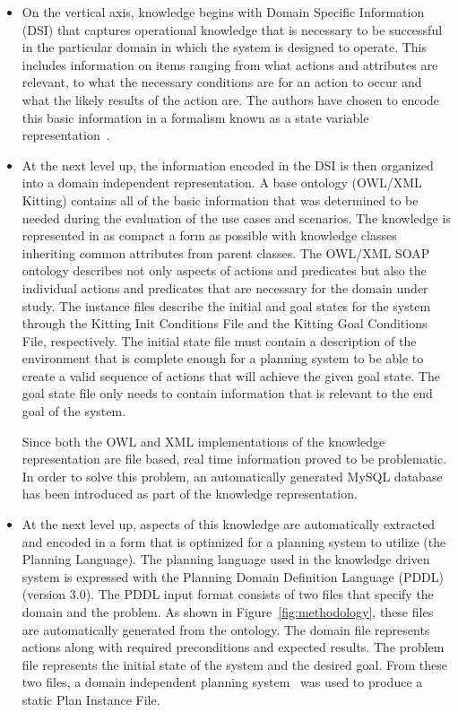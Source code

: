 \begin{itemize}
\item On the vertical axis, knowledge begins with Domain Specific Information
(DSI) that captures operational knowledge that is necessary to be
successful in the particular domain in which the system is designed to
operate. This includes information on items ranging from what actions and
attributes are relevant, to what the necessary conditions are for an action
to occur and what the likely results of the action are. The authors have
chosen to encode this basic information in a formalism known as a state
variable representation~\cite{NAU.2004}.

\item At the next level up, the information encoded in the DSI is then organized into a domain
independent representation. A base ontology (\textsf{OWL/XML Kitting})
contains all of the basic information that was determined to be needed
during the evaluation of the use cases and scenarios. The knowledge is
represented in as compact a form as possible with knowledge classes
inheriting common attributes from parent classes. The \textsf{OWL/XML SOAP}
ontology describes not only aspects of actions and predicates but also the
individual actions and predicates that are necessary for the domain under
study. The instance files describe the initial and goal states for the
system through the \textsf{Kitting Init Conditions File} and the
\textsf{Kitting Goal Conditions File}, respectively. The initial state file
must contain a description of the environment that is complete enough for a
planning system to be able to create a valid sequence of actions that will
achieve the given goal state. The goal state file only needs to contain
information that is relevant to the end goal of the system.

Since both the OWL and XML implementations of the knowledge representation are file based, real time information proved to be problematic. In order to solve this problem, an automatically generated MySQL database has been introduced as part of the knowledge representation.

\item At the next level up, aspects of this knowledge are automatically extracted and encoded in a form
that is optimized for a planning system to utilize (the Planning Language).
The planning language used in the knowledge driven system is expressed with
the Planning Domain Definition Language (PDDL)~\cite{PDDL} (version 3.0).
The PDDL input format consists of two files that specify the domain and the
problem. As shown in Figure~\ref{fig:methodology}, these files are
automatically generated from the ontology. The domain file represents
actions along with required preconditions and expected results. The problem
file represents the initial state of the system and the desired goal. From
these two files, a domain independent planning
system~\cite{Coles.ICAPS.2010} was used to produce a static \textsf{Plan Instance File}.


\end{itemize}
